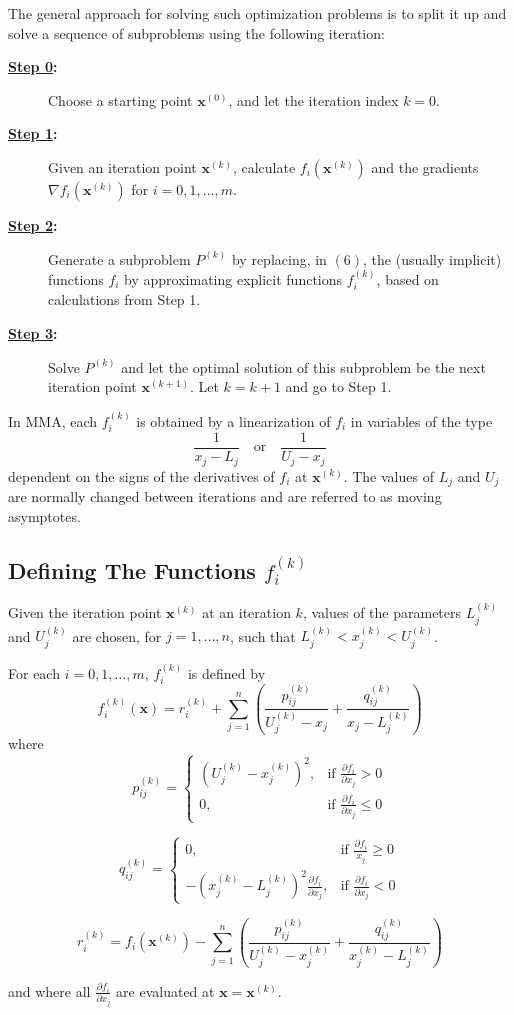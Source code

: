 \documentclass[11pt]{article}
\begin{document}
The general approach for solving such optimization problems is to split it up and solve a sequence of subproblems using the following iteration:
{\color{baystate}
\begin{description}
	\item[\textbf{\underline{Step 0}:}] Choose a starting point $\mathbf{x}^{(0)}$, and let the iteration index $k=0$.
	\item[\textbf{\underline{Step 1}:}] Given an iteration point $\mathbf{x}^{(k)}$, calculate $f_i(\mathbf{x}^{(k)})$ and the gradients $\nabla f_i(\mathbf{x}^{(k)})$ for $i=0,1,\ldots,m$.
	\item[\textbf{\underline{Step 2}:}] Generate a subproblem $P^{(k)}$ by replacing, in $(6)$, the (usually implicit) functions $f_i$ by approximating explicit functions $f_i^{(k)}$, based on calculations from Step 1.
	\item[\textbf{\underline{Step 3}:}] Solve $P^{(k)}$ and let the optimal solution of this subproblem be the next iteration point $\mathbf{x}^{(k+1)}$. Let $k=k+1$ and go to Step 1.
\end{description}
}

In MMA, each $f_i^{(k)}$ is obtained by a linearization of $f_i$ in variables of the type $$\frac{1}{x_j-L_j}\quad\text{or}\quad\frac{1}{U_j-x_j}$$ dependent on the signs of the derivatives of $f_i$ at $\mathbf{x}^{(k)}$. The values of $L_j$ and $U_j$ are normally changed between iterations and are referred to as {\color{tiananmen}moving asymptotes}.

\subsection{Defining The Functions $f_i^{(k)}$}

Given the iteration point $\mathbf{x}^{(k)}$ at an iteration $k$, values of the parameters $L_j^{(k)}$ and $U_j^{(k)}$ are chosen, for $j=1,\ldots,n$, such that $L_j^{(k)}<x_j^{(k)}<U_j^{(k)}$.

{\color{baystate}
For each $i=0,1,\ldots,m$, $f_i^{(k)}$ is defined by $$f_i^{(k)}(\mathbf{x})=r_i^{(k)}+\sum\limits_{j=1}^{n}\left(\frac{p_{ij}^{(k)}}{U_j^{(k)}-x_j}+\frac{q_{ij}^{(k)}}{x_j-L_j^{(k)}}\right)$$
where
$$p_{ij}^{(k)}=\begin{cases}
	\left(U_j^{(k)}-x_j^{(k)}\right)^2, & \text{if }\frac{\partial f_i}{\partial x_j}>0\\
	0, & \text{if }\frac{\partial f_i}{\partial x_j}\leq 0
\end{cases}$$

$$q_{ij}^{(k)}=\begin{cases}
	0, & \text{if }\frac{\partial f_i}{x_j}\geq 0\\
	-\left(x_j^{(k)}-L_j^{(k)}\right)^2\frac{\partial f_i}{\partial x_j}, & \text{if }\frac{\partial f_i}{\partial x_j}<0
\end{cases}$$

$$r_i^{(k)}=f_i(\mathbf{x}^{(k)})-\sum\limits_{j=1}^{n}\left(\frac{p_{ij}^{(k)}}{U_j^{(k)}-x_j^{(k)}}+\frac{q_{ij}^{(k)}}{x_j^{(k)}-L_j^{(k)}}\right)$$

and where all $\frac{\partial f_i}{\partial x_j}$ are evaluated at $\mathbf{x}=\mathbf{x}^{(k)}$.
}
\end{document}
